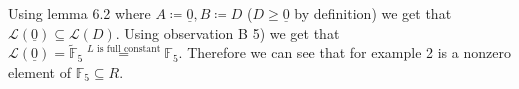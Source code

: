 \documentclass[12pt, a4paper]{article}
\begin{document}
\begin{enumerate}[label=(\alph*)]
Using lemma 6.2 where $A \coloneqq \underline{0}, B \coloneqq D$ ($D \geq \underline{0}$ by definition) we get that $\mathcal{L}(\underline{0}) \subseteq \mathcal{L}(D)$. Using observation B 5) we get that $\mathcal{L}(\underline{0}) = \tilde{\mathbb{F}}_5 \stackrel{L\text{ is full constant}}{=} \mathbb{F}_5$. Therefore we can see that for example 2 is a nonzero element of $\mathbb{F}_5 \subseteq R$.

\end{enumerate}
\end{document}
